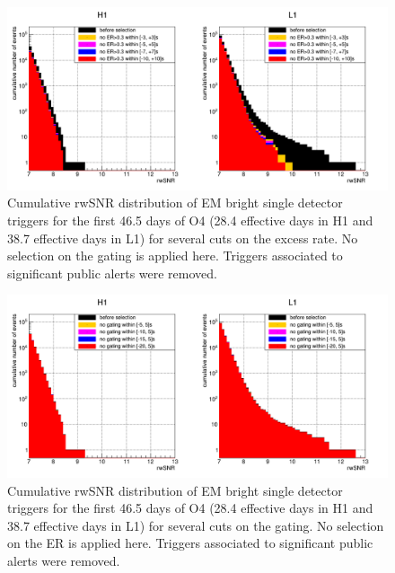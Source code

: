 \begin{figure}
  \centering
  \includegraphics[width=\linewidth]{sectionO4/compareCutER_bright.png}
  \caption{Cumulative rwSNR distribution of EM bright single detector triggers for the first 46.5 days of O4 (28.4 effective days in H1 and 38.7 effective days in L1) for several cuts on the excess rate. No selection on the gating is applied here. Triggers associated to significant public alerts were removed.}
  \label{fig:cutER_bright_O4}
\end{figure}
%
\begin{figure}
  \centering
  \includegraphics[width=\linewidth]{sectionO4/compareCutGating_bright.png}
  \caption{Cumulative rwSNR distribution of EM bright single detector triggers for the first 46.5 days of O4 (28.4 effective days in H1 and 38.7 effective days in L1) for several cuts on the gating. No selection on the ER is applied here. Triggers associated to significant public alerts were removed.}
  \label{fig:cutGating_bright_O4}
\end{figure}
%
%
%
